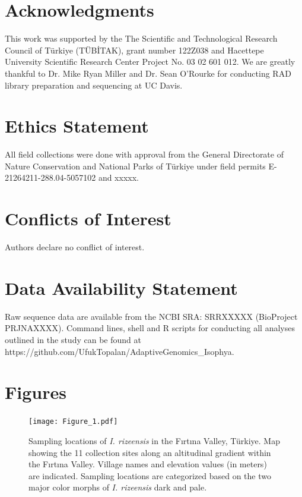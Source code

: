 \documentclass[9pt,a4paper,twoside]{rho-class/rho}
\begin{document}
\section{Acknowledgments}
This work was supported by the The Scientific and Technological Research Council of Türkiye (TÜBİTAK), grant number 122Z038 and Hacettepe University Scientific Research Center Project No. 03 02 601 012. We are greatly thankful to Dr. Mike Ryan Miller and Dr. Sean O'Rourke for conducting RAD library preparation and sequencing at UC Davis.  

\section{Ethics Statement}
All field collections were done with approval from the General Directorate of Nature Conservation and National Parks of Türkiye under field permits E-21264211-288.04-5057102 and xxxxx.

\section{Conflicts of Interest}
Authors declare no conflict of interest.

\section{Data Availability Statement}
Raw sequence data are available from the NCBI SRA: SRRXXXXX (BioProject PRJNAXXXX). Command lines, shell and R scripts for conducting all analyses outlined in the study can be found at https://github.com/UfukTopalan/AdaptiveGenomics\_Isophya.

\printbibliography
\clearpage\section{Figures}
\begin{figure}[h]
\centering
\texttt{[image: Figure\_1.pdf]}
\caption{Sampling locations of \textit{I. rizeensis} in the Fırtına Valley, Türkiye. Map showing the 11 collection sites along an altitudinal gradient within the Fırtına Valley. Village names and elevation values (in meters) are indicated. Sampling locations are categorized based on the two major color morphs of \textit{I. rizeensis} dark and pale.}
\label{Figure 1}
\end{figure}
\end{document}
